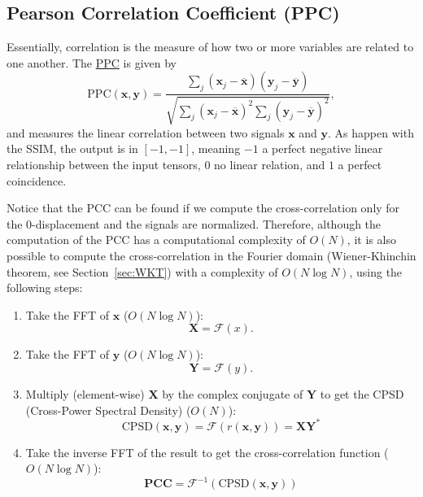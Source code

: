 \documentclass{article}
\begin{document}

\subsection{Pearson Correlation Coefficient (PPC)}
Essentially, correlation is the measure of how two or more variables
are related to one another. The
\href{https://en.wikipedia.org/wiki/Pearson_correlation_coefficient}{PPC}
is given by
\begin{equation}
  \text{PPC}(\mathbf{x}, \mathbf{y}) = \frac{\sum_j(\mathbf{x}_j - \overline{\mathbf{x}})(\mathbf{y}_j - \overline{\mathbf{y}})}{\sqrt{\sum_j (\mathbf{x}_j - \overline{\mathbf{x}})^2 \sum_j (\mathbf{y}_j - \overline{\mathbf{y}})^2}},
\end{equation}
and measures the linear correlation between two signals $\mathbf{x}$
and $\mathbf{y}$.  As happen with the SSIM, the output is in
$[-1, -1]$, meaning $-1$ a perfect negative linear relationship
between the input tensors, $0$ no linear relation, and $1$ a perfect
coincidence.

Notice that the PCC can be found if we compute the cross-correlation
only for the 0-displacement and the signals are normalized. Therefore,
although the computation of the PCC has a computational complexity of
$O(N)$, it is also possible to compute the cross-correlation in the
Fourier domain (Wiener-Khinchin theorem, see Section~\ref{sec:WKT})
with a complexity of $O(N\log N)$, using the following steps:
\begin{enumerate}
\item Take the FFT of $\mathbf{x}$ ($O(N\log N)$):
  \begin{equation}
    \mathbf{X} = \mathcal{F}(x).
  \end{equation}
\item Take the FFT of $\mathbf{y}$ ($O(N\log N)$):
  \begin{equation}
    \mathbf{Y} = \mathcal{F}(y).
  \end{equation}
\item Multiply (element-wise) $\mathbf{X}$ by the complex conjugate of
  $\mathbf{Y}$ to get the CPSD (Cross-Power Spectral Density) ($O(N)$):
  \begin{equation}
    \text{CPSD}(\mathbf{x},\mathbf{y})=\mathcal{F}({r(\mathbf{x},\mathbf{y})})=\mathbf{X}\mathbf{Y}^*
  \end{equation}
\item Take the inverse FFT of the result to get the cross-correlation
  function ($O(N\log N)$):
  \begin{equation}
    \mathbf{PCC} = \mathcal{F}^{-1}(\text{CPSD}(\mathbf{x},\mathbf{y}))
  \end{equation}
\end{enumerate}
\end{document}
